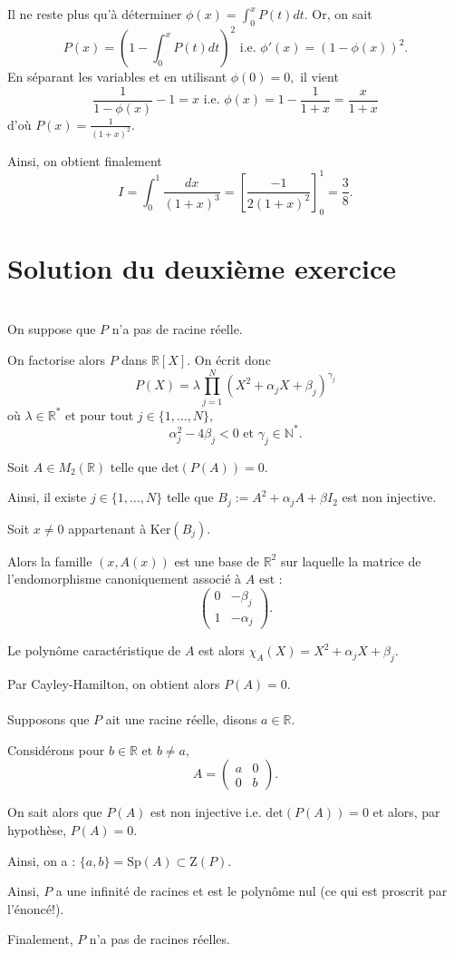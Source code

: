 Il ne reste plus qu'à déterminer $\displaystyle \phi(x)=\int_{0}^{x}P(t)dt.$
Or, on sait $$\displaystyle P(x)=\left(1-\int_{0}^{x}P(t)dt\right)^{2} \mbox{ i.e. } \phi'(x)=\left(1-\phi(x)\right)^{2}.$$
En séparant les variables et en utilisant $\phi(0)=0,$ il vient $$ \frac{1}{1-\phi(x)}-1=x \mbox{ i.e. } \phi(x)=1-\frac{1}{1+x}=\frac{x}{1+x}$$ d'où $\displaystyle P(x)=\frac{1}{(1+x)^{2}}.$

Ainsi, on obtient finalement $$ I=\int_{0}^{1}\frac{dx}{(1+x)^{3}}=\left[\frac{-1}{2(1+x)^{2}}\right]_{0}^{1}=\frac{3}{8}.$$

\section{Solution du deuxième exercice}

\\

On suppose que $P$ n'a pas de racine réelle.

On factorise alors $P$ dans $\mathbb{R}[X].$ On écrit donc $$P(X)=\lambda\prod_{j=1}^{N}(X^{2}+\alpha_{j}X+\beta_{j})^{\gamma_{j}}$$ où $\lambda\in \mathbb{R}^{*}$ et pour tout $j\in\{1,\ldots,N\},$ $$\alpha_{j}^{2}-4\beta_{j}<0 \mbox{ et } \gamma_{j}\in \mathbb{N}^{*}.$$

Soit $A\in M_{2}(\mathbb{R})$ telle que $\mbox{det}(P(A))=0.$

Ainsi, il existe $j\in\{1,\ldots,N\}$ telle que $B_{j}:=A^{2}+\alpha_{j}A+\beta I_{2}$ est non injective.

Soit $x\neq 0$ appartenant à $\mbox{Ker}(B_{j}).$

Alors la famille $(x,A(x))$ est une base de $\mathbb{R}^{2}$ sur laquelle la matrice de l'endomorphisme canoniquement associé à $A$ est : $$\left( \begin{array}{ll}
0 & -\beta_{j}\\
1 & -\alpha_{j}
\end{array}\right).$$

Le polynôme caractéristique de $A$ est alors $\displaystyle \chi_{A}(X)=X^{2}+\alpha_{j}X+\beta_{j}.$

Par Cayley-Hamilton, on obtient alors $\displaystyle P(A)=0.$\\

\\

Supposons que $P$ ait une racine réelle, disons $a\in\mathbb{R}.$

Considérons pour $b\in\mathbb{R} \mbox{ et } b\neq a,$ $$A=\left( \begin{array}{ll}
a & 0\\
0 & b
\end{array}\right).$$

On sait alors que $P(A)$ est non injective i.e. $\displaystyle \mbox{det}(P(A))=0$ et alors, par hypothèse, $\displaystyle P(A)=0.$

Ainsi, on a : $\displaystyle \{a,b\}=\mbox{Sp}(A)\subset \mbox{Z}(P).$

Ainsi, $P$ a une infinité de racines et est le polynôme nul (ce qui est proscrit par l'énoncé!).

Finalement, $P$ n'a pas de racines réelles.